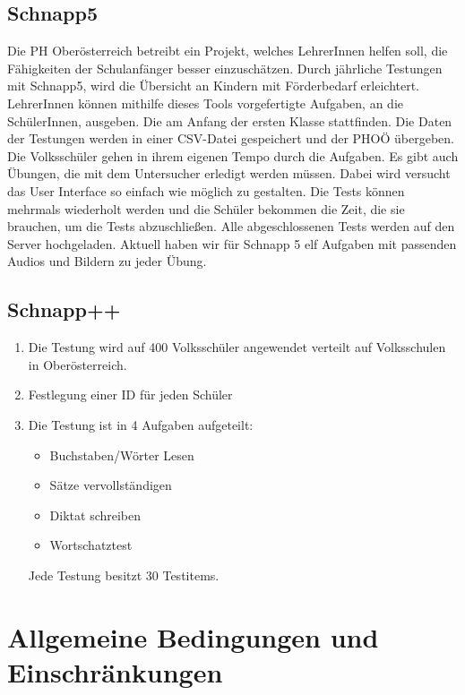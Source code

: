 \documentclass[12pt]{article}
\theoremstyle{definition}
\begin{document}
\subsection{Schnapp5}
Die PH Oberösterreich betreibt ein Projekt, welches LehrerInnen helfen soll, die Fähigkeiten der Schulanfänger besser einzuschätzen.
Durch jährliche Testungen mit Schnapp5, wird die Übersicht an Kindern mit Förderbedarf erleichtert.
LehrerInnen können mithilfe dieses Tools vorgefertigte Aufgaben, an die SchülerInnen, ausgeben. Die am Anfang der ersten Klasse stattfinden. 
Die Daten der Testungen werden in einer CSV-Datei gespeichert und der PHOÖ übergeben. 
\newline
Die Volksschüler gehen in ihrem eigenen Tempo durch die Aufgaben. 
Es gibt auch Übungen, die mit dem Untersucher erledigt werden müssen. 
Dabei wird versucht das User Interface so einfach wie möglich zu gestalten.
Die Tests können mehrmals wiederholt werden und die Schüler bekommen die Zeit, die sie brauchen, um die Tests abzuschließen. 
Alle abgeschlossenen Tests werden auf den Server hochgeladen.
\newline
Aktuell haben wir für Schnapp 5 elf Aufgaben mit passenden Audios und Bildern zu jeder Übung.
\newline


\subsection{Schnapp++}
\begin{enumerate}
\item Die Testung wird auf 400 Volksschüler angewendet verteilt auf Volksschulen in Oberösterreich.
\item Festlegung einer ID für jeden Schüler
\item Die Testung ist in 4 Aufgaben aufgeteilt:
\begin{itemize}
\item Buchstaben/Wörter Lesen
\item Sätze vervollständigen
\item Diktat schreiben
\item Wortschatztest
\end{itemize}
Jede Testung besitzt 30 Testitems.
\end{enumerate}



\pagebreak

\section{Allgemeine Bedingungen und Einschränkungen}
\end{document}
